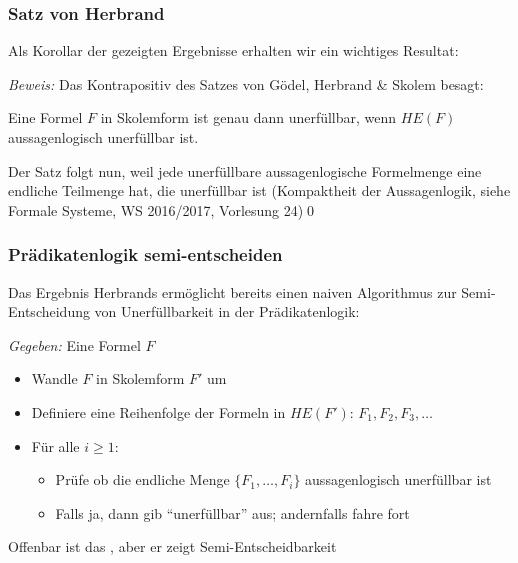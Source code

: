 \documentclass[onlymath]{beamer}
\begin{document}
\begin{frame}\frametitle{Satz von Herbrand}

Als Korollar der gezeigten Ergebnisse erhalten wir ein wichtiges Resultat:


\pause\emph{Beweis:} Das Kontrapositiv des Satzes von Gödel, Herbrand \& Skolem besagt:\medskip

Eine Formel $F$ in Skolemform ist genau dann unerfüllbar, wenn $HE(F)$ aussagenlogisch unerfüllbar ist.\bigskip

Der Satz folgt nun, weil jede unerfüllbare aussagenlogische Formelmenge eine endliche
Teilmenge hat, die unerfüllbar ist (Kompaktheit der Aussagenlogik, siehe Formale Systeme, WS 2016/2017, Vorlesung 24)\qed

\end{frame}

\begin{frame}\frametitle{Prädikatenlogik semi-entscheiden}

Das Ergebnis Herbrands ermöglicht bereits einen naiven Algorithmus zur Semi-Entscheidung von Unerfüllbarkeit in der Prädikatenlogik:\bigskip

\emph{Gegeben:} Eine Formel $F$
\begin{itemize}
\item Wandle $F$ in Skolemform $F'$ um
\item Definiere eine Reihenfolge der Formeln in $HE(F')$: $F_1,F_2,F_3,\ldots$
\item Für alle $i\geq 1$:
	\begin{itemize}
	\item Prüfe ob die endliche Menge $\{F_1,\ldots, F_i\}$ aussagenlogisch unerfüllbar ist
	\item Falls ja, dann gib "`unerfüllbar"' aus; andernfalls fahre fort
	\end{itemize}
\end{itemize}

Offenbar ist das , aber er zeigt Semi-Entscheidbarkeit

\end{frame}

\end{document}

